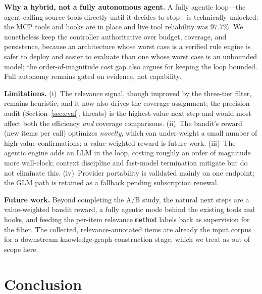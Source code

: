 \documentclass[conference]{IEEEtran}
\newcommand{\code}[1]{\texttt{\small #1}}
\begin{document}
\textbf{Why a hybrid, not a fully autonomous agent.} A fully agentic loop---the agent calling source tools directly until it decides to stop---is technically unlocked: the MCP tools and hooks are in place and live tool reliability was $97.7\%$. We nonetheless keep the controller authoritative over budget, coverage, and persistence, because an architecture whose worst case is a verified rule engine is safer to deploy and easier to evaluate than one whose worst case is an unbounded model; the order-of-magnitude cost gap also argues for keeping the loop bounded. Full autonomy remains gated on evidence, not capability.

\textbf{Limitations.} (i)~The relevance signal, though improved by the three-tier filter, remains heuristic, and it now also drives the coverage assignment; the precision audit (Section~\ref{sec:eval}, threats) is the highest-value next step and would most affect both the efficiency \emph{and} coverage comparisons. (ii)~The bandit's reward (new items per call) optimizes \emph{novelty}, which can under-weight a small number of high-value confirmations; a value-weighted reward is future work. (iii)~The agentic engine adds an LLM in the loop, costing roughly an order of magnitude more wall-clock; context discipline and fast-model termination mitigate but do not eliminate this. (iv)~Provider portability is validated mainly on one endpoint; the GLM path is retained as a fallback pending subscription renewal.

\textbf{Future work.} Beyond completing the A/B study, the natural next steps are a value-weighted bandit reward, a fully agentic mode behind the existing tools and hooks, and feeding the per-item relevance \code{method} labels back as supervision for the filter. The collected, relevance-annotated items are already the input corpus for a downstream knowledge-graph construction stage, which we treat as out of scope here.

\section{Conclusion}
\end{document}
